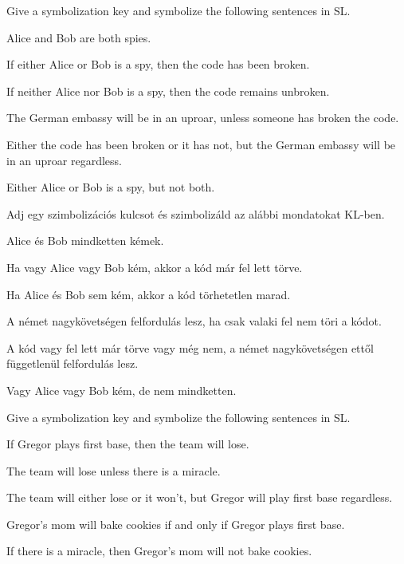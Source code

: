 

\solutions
\problempart
\label{pr.spies}
Give a symbolization key and symbolize the following sentences in SL.
\begin{earg}
\item Alice and Bob are both spies.
\item If either Alice or Bob is a spy, then the code has been broken.
\item If neither Alice nor Bob is a spy, then the code remains unbroken.
\item The German embassy will be in an uproar, unless someone has broken the code.
\item Either the code has been broken or it has not, but the German embassy will be in an uproar regardless.
\item Either Alice or Bob is a spy, but not both.
\end{earg}


\solutions
\problempart
\label{pr.spies}
Adj egy szimbolizációs kulcsot és szimbolizáld az alábbi mondatokat KL-ben.
\begin{earg}
\item Alice és Bob mindketten kémek.
\item Ha vagy Alice vagy Bob kém, akkor a kód már fel lett törve.
\item Ha Alice és Bob sem kém, akkor a kód törhetetlen marad.
\item A német nagykövetségen felfordulás lesz, ha csak valaki fel nem töri a kódot.
\item A kód vagy fel lett már törve vagy még nem, a német nagykövetségen ettől függetlenül felfordulás lesz.
\item Vagy Alice vagy Bob kém, de nem mindketten.
\end{earg}


\problempart Give a symbolization key and symbolize the following sentences in SL.
\begin{earg}
\item If Gregor plays first base, then the team will lose.
\item The team will lose unless there is a miracle.
\item The team will either lose or it won't, but Gregor will play first base regardless.
\item Gregor's mom will bake cookies if and only if Gregor plays first base.
\item If there is a miracle, then Gregor's mom will not bake cookies.
\end{earg}


